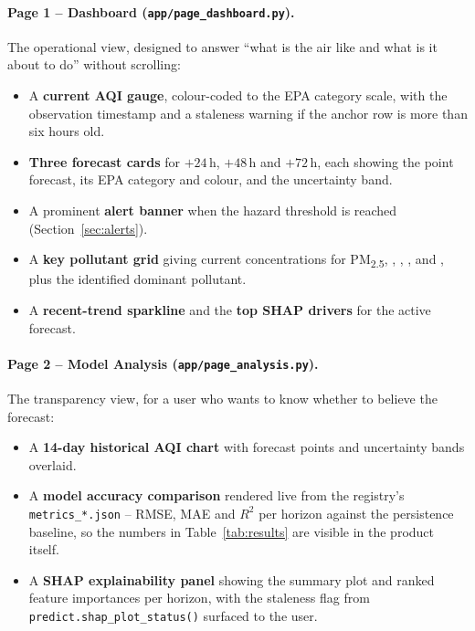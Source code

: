 \documentclass[11pt,a4paper]{article}
\newcommand{\pmfine}{PM\textsubscript{2.5}\xspace}
\begin{document}
\paragraph{Page 1 -- Dashboard (\texttt{app/page\_dashboard.py}).}
The operational view, designed to answer ``what is the air like and what is it
about to do'' without scrolling:
\begin{itemize}[itemsep=1pt]
  \item A \textbf{current AQI gauge}, colour-coded to the EPA category scale,
        with the observation timestamp and a staleness warning if the anchor
        row is more than six hours old.
  \item \textbf{Three forecast cards} for $+24$\,h, $+48$\,h and $+72$\,h,
        each showing the point forecast, its EPA category and colour, and the
        uncertainty band.
  \item A prominent \textbf{alert banner} when the hazard threshold is
        reached (Section~\ref{sec:alerts}).
  \item A \textbf{key pollutant grid} giving current concentrations for
        \pmfine, , , ,  and , plus
        the identified dominant pollutant.
  \item A \textbf{recent-trend sparkline} and the \textbf{top SHAP drivers}
        for the active forecast.
\end{itemize}

\paragraph{Page 2 -- Model Analysis (\texttt{app/page\_analysis.py}).}
The transparency view, for a user who wants to know whether to believe the
forecast:
\begin{itemize}[itemsep=1pt]
  \item A \textbf{14-day historical AQI chart} with forecast points and
        uncertainty bands overlaid.
  \item A \textbf{model accuracy comparison} rendered live from the registry's
        \texttt{metrics\_*.json} -- RMSE, MAE and $R^2$ per horizon against
        the persistence baseline, so the numbers in
        Table~\ref{tab:results} are visible in the product itself.
  \item A \textbf{SHAP explainability panel} showing the summary plot and
        ranked feature importances per horizon, with the staleness flag from
        \texttt{predict.shap\_plot\_status()} surfaced to the user.
\end{itemize}
\end{document}
